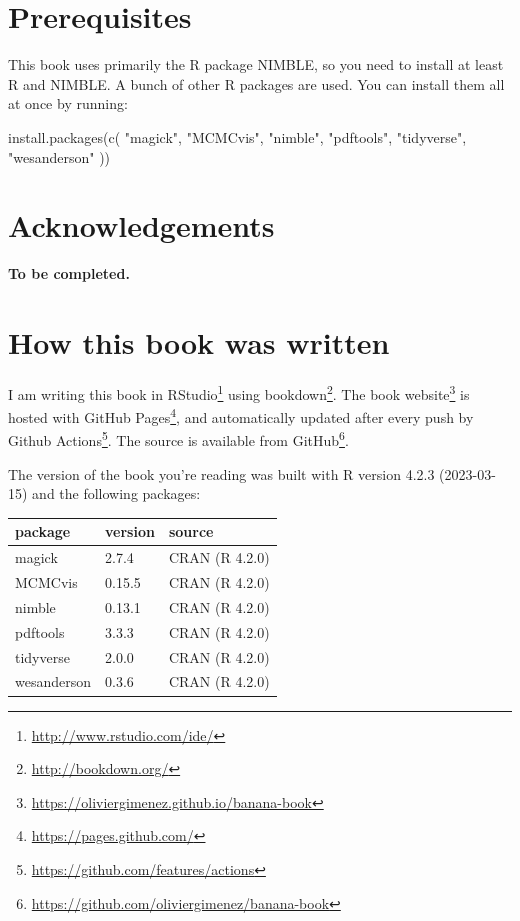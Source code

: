 \documentclass[
  12pt,
]{krantz}
\newenvironment{Shaded}{\begin{snugshade}}{\end{snugshade}}
\newcommand{\FunctionTok}[1]{\textcolor[rgb]{0.00,0.00,0.00}{#1}}
\newcommand{\NormalTok}[1]{#1}
\newcommand{\StringTok}[1]{\textcolor[rgb]{0.31,0.60,0.02}{#1}}
\renewcommand{\href}[2]{#2\footnote{\url{#1}}}
\begin{document}
\hypertarget{prerequisites}{%
\section*{Prerequisites}\label{prerequisites}}


This book uses primarily the R package NIMBLE, so you need to install at least R and NIMBLE. A bunch of other R packages are used. You can install them all at once by running:

\begin{Shaded}
\begin{Highlighting}[]
\FunctionTok{install.packages}\NormalTok{(}\FunctionTok{c}\NormalTok{(}
  \StringTok{"magick"}\NormalTok{, }\StringTok{"MCMCvis"}\NormalTok{, }\StringTok{"nimble"}\NormalTok{, }\StringTok{"pdftools"}\NormalTok{, }
  \StringTok{"tidyverse"}\NormalTok{, }\StringTok{"wesanderson"} 
\NormalTok{))}
\end{Highlighting}
\end{Shaded}

\hypertarget{acknowledgements}{%
\section*{Acknowledgements}\label{acknowledgements}}


\textbf{To be completed.}

\hypertarget{how-this-book-was-written}{%
\section*{How this book was written}\label{how-this-book-was-written}}


I am writing this book in \href{http://www.rstudio.com/ide/}{RStudio} using \href{http://bookdown.org/}{bookdown}. The \href{https://oliviergimenez.github.io/banana-book}{book website} is hosted with \href{https://pages.github.com/}{GitHub Pages}, and automatically updated after every push by \href{https://github.com/features/actions}{Github Actions}. The source is available from \href{https://github.com/oliviergimenez/banana-book}{GitHub}.

The version of the book you're reading was built with R version 4.2.3 (2023-03-15) and the following packages:

\begin{longtable}[]{@{}lll@{}}
\toprule()
package & version & source \\
\midrule()
\endhead
magick & 2.7.4 & CRAN (R 4.2.0) \\
MCMCvis & 0.15.5 & CRAN (R 4.2.0) \\
nimble & 0.13.1 & CRAN (R 4.2.0) \\
pdftools & 3.3.3 & CRAN (R 4.2.0) \\
tidyverse & 2.0.0 & CRAN (R 4.2.0) \\
wesanderson & 0.3.6 & CRAN (R 4.2.0) \\
\bottomrule()
\end{longtable}
\end{document}

